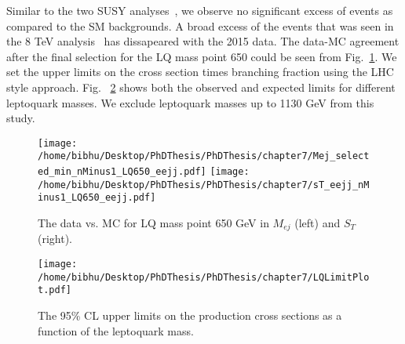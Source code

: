 Similar to the two SUSY analyses~\cite{CMS-PAS-SUS-15-002,CMS-PAS-SUS-16-014}, we observe no significant excess of events as compared to the SM backgrounds. A broad excess of the events that was seen in the 8 TeV analysis~\cite{CMS-PAS-EXO-12-041} has dissapeared with the 2015 data. The data-MC agreement after the final selection for the LQ mass point 650 could be seen from Fig.~\ref{figure:DataMCfinalSelection}. We set the upper limits on the cross section times branching fraction using the LHC style approach. Fig. ~\ref{figure:LimitLQ12016} shows both the observed and expected limits for different leptoquark masses. We exclude leptoquark masses up to 1130 GeV from this study. 

\begin{figure}[h]
\centering
\texttt{[image: /home/bibhu/Desktop/PhDThesis/PhDThesis/chapter7/Mej\_selected\_min\_nMinus1\_LQ650\_eejj.pdf]}
\texttt{[image: /home/bibhu/Desktop/PhDThesis/PhDThesis/chapter7/sT\_eejj\_nMinus1\_LQ650\_eejj.pdf]}

\caption{\label{figure:DataMCfinalSelection} The data vs. MC for LQ mass point 650 GeV in $M_{ej}$ (left) and $S_{T}$ (right). }
\end{figure}



\begin{figure}[h]
\centering
\texttt{[image: /home/bibhu/Desktop/PhDThesis/PhDThesis/chapter7/LQLimitPlot.pdf]}
\caption{\label{figure:LimitLQ12016}The 95\% CL upper limits on the production cross sections as a function of the leptoquark mass.}
\end{figure}











